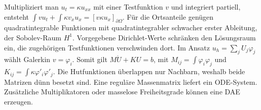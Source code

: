 \hypertarget{punkt7-4-1}{}
Multipliziert man \(u_t=\kappa u_{xx}\) mit einer Testfunktion \(v\) und integriert partiell, entsteht \(\int v u_t+\int \kappa v_xu_x=[v\kappa u_x]_{\partial\Omega}\). Für die Ortsanteile genügen quadratintegrable Funktionen mit quadratintegrabler schwacher erster Ableitung, der Sobolev-Raum \(H^1\). Vorgegebene Dirichlet-Werte schränken den Lösungsraum ein, die zugehörigen Testfunktionen verschwinden dort.
\hypertarget{punkt7-4-2}{}
Im Ansatz \(u_h=\sum_j U_j\varphi_j\) wählt Galerkin \(v=\varphi_i\). Somit gilt \(M\dot U+KU=b\), mit \(M_{ij}=\int\varphi_i\varphi_j\) und \(K_{ij}=\int\kappa\varphi'_i\varphi'_j\). Die Hutfunktionen überlappen nur Nachbarn, weshalb beide Matrizen dünn besetzt sind. Eine reguläre Massenmatrix liefert ein ODE-System. Zusätzliche Multiplikatoren oder masselose Freiheitsgrade können eine DAE erzeugen.

